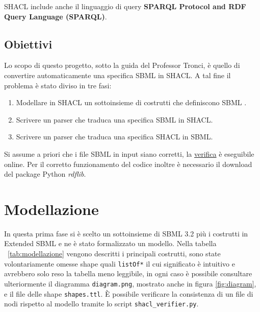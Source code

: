 \documentclass{article}
\begin{document}
SHACL include anche il linguaggio di query \textbf{SPARQL Protocol and RDF Query Language (SPARQL)}.

\subsection{Obiettivi}

Lo scopo di questo progetto, sotto la guida del Professor Tronci, è quello di convertire automaticamente una specifica SBML in SHACL. A tal fine il problema è stato diviso in tre fasi:

\begin{enumerate}
    \item Modellare in SHACL un sottoinsieme di costrutti che definiscono SBML . 
    \item Scrivere un parser che traduca una specifica SBML in SHACL.
    \item Scrivere un parser che traduca una specifica SHACL in SBML.
\end{enumerate}

Si assume a priori che i file SBML in input siano corretti, la \href{http://sbml.org/Facilities/Validator}{verifica} è eseguibile online. Per il corretto funzionamento del codice inoltre è necessario il download del package Python \textit{rdflib}.

\section{Modellazione}

In questa prima fase si è scelto un sottoinsieme di SBML 3.2 più i costrutti in Extended SBML e ne è stato formalizzato un modello. Nella tabella ~\ref{tab:modellazione} vengono descritti i principali costrutti, sono state volontariamente omesse shape quali \texttt{listOf*} il cui significato è intuitivo e avrebbero solo reso la tabella meno leggibile, in ogni caso è possibile consultare ulteriormente il diagramma \texttt{diagram.png}, mostrato anche in figura \ref{fig:diagram}, e il file delle shape \texttt{shapes.ttl}. È possibile verificare la consistenza di un file di nodi rispetto al modello tramite lo script \texttt{shacl\_verifier.py}.
\end{document}
